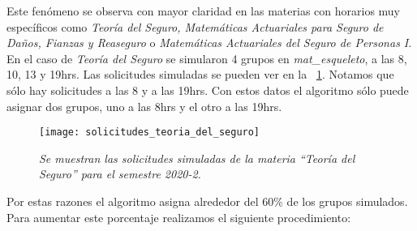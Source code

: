 Este fenómeno se observa con mayor claridad en las materias con horarios muy específicos como \textit{Teoría del Seguro, Matemáticas Actuariales para Seguro de Daños, Fianzas y Reaseguro} o \textit{Matemáticas Actuariales del Seguro de Personas I}. En el caso de \textit{Teoría del Seguro} se simularon 4 grupos en \textit{mat\_esqueleto}, a las 8, 10, 13 y 19hrs. Las solicitudes simuladas se pueden ver en la \figurename{~\ref{sol_TeoSeguro}}. Notamos que sólo hay solicitudes a las 8 y a las 19hrs. Con estos datos el algoritmo sólo puede asignar dos grupos, uno a las 8hrs y el otro a las 19hrs.

\begin{figure}[H]
\centering
\texttt{[image: solicitudes\_teoria\_del\_seguro]} %
\caption[\textit{Solicitudes de la materia ``Teoría del Seguro''}]{\textit{Se muestran las solicitudes simuladas de la materia ``Teoría del Seguro'' para el semestre 2020-2.}}\label{sol_TeoSeguro}
\end{figure}

Por estas razones el algoritmo asigna alrededor del $60\%$ de los grupos simulados. Para aumentar este porcentaje realizamos el siguiente procedimiento:

